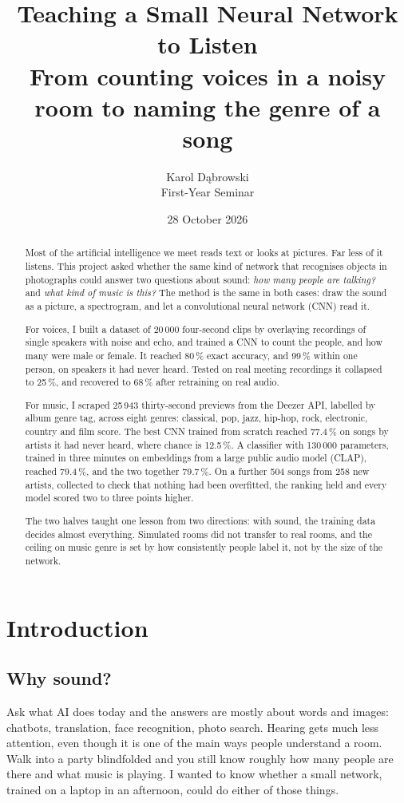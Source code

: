\documentclass[11pt]{article}
\title{Teaching a Small Neural Network to Listen\\\large From counting voices in a noisy room to naming the genre of a song}
\author{Karol D\k{a}browski \\ First-Year Seminar}
\date{28 October 2026}
\begin{document}
\maketitle

\begin{abstract}
Most of the artificial intelligence we meet reads text or looks at pictures. Far less of it listens. This project asked whether the same kind of network that recognises objects in photographs could answer two questions about sound: \emph{how many people are talking?} and \emph{what kind of music is this?} The method is the same in both cases: draw the sound as a picture, a spectrogram, and let a convolutional neural network (CNN) read it.

For voices, I built a dataset of 20\,000 four-second clips by overlaying recordings of single speakers with noise and echo, and trained a CNN to count the people, and how many were male or female. It reached 80\,\% exact accuracy, and 99\,\% within one person, on speakers it had never heard. Tested on real meeting recordings it collapsed to 25\,\%, and recovered to 68\,\% after retraining on real audio.

For music, I scraped 25\,943 thirty-second previews from the Deezer API, labelled by album genre tag, across eight genres: classical, pop, jazz, hip-hop, rock, electronic, country and film score. The best CNN trained from scratch reached 77.4\,\% on songs by artists it had never heard, where chance is 12.5\,\%. A classifier with 130\,000 parameters, trained in three minutes on embeddings from a large public audio model (CLAP), reached 79.4\,\%, and the two together 79.7\,\%. On a further 504 songs from 258 new artists, collected to check that nothing had been overfitted, the ranking held and every model scored two to three points higher.

The two halves taught one lesson from two directions: with sound, the training data decides almost everything. Simulated rooms did not transfer to real rooms, and the ceiling on music genre is set by how consistently people label it, not by the size of the network.
\end{abstract}

\tableofcontents

\section{Introduction}

\subsection{Why sound?}
Ask what AI does today and the answers are mostly about words and images: chatbots, translation, face recognition, photo search. Hearing gets much less attention, even though it is one of the main ways people understand a room. Walk into a party blindfolded and you still know roughly how many people are there and what music is playing. I wanted to know whether a small network, trained on a laptop in an afternoon, could do either of those things.
\end{document}
